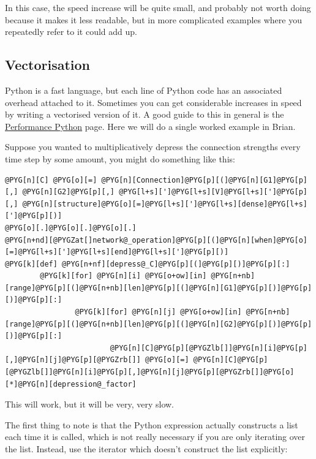 \documentclass[letterpaper,10pt,english]{manual}
\begin{document}
In this case, the speed increase will be quite small, and probably
not worth doing because it makes it less readable, but in more
complicated examples where you repeatedly refer to 
it could add up.
\hypertarget{efficiency-vectorisation}{}

\subsection{Vectorisation}

Python is a fast language, but each line of Python code has an
associated overhead attached to it. Sometimes you can get considerable
increases in speed by writing a vectorised version of it. A good guide
to this in general is the \href{http://www.scipy.org/PerformancePython}{Performance Python}
page. Here we will do a single worked example in Brian.

Suppose you wanted to multiplicatively depress the connection
strengths every time step by some amount, you might do something like
this:

\begin{Verbatim}[commandchars=@\[\]]
@PYG[n][C] @PYG[o][=] @PYG[n][Connection]@PYG[p][(]@PYG[n][G1]@PYG[p][,] @PYG[n][G2]@PYG[p][,] @PYG[l+s][']@PYG[l+s][V]@PYG[l+s][']@PYG[p][,] @PYG[n][structure]@PYG[o][=]@PYG[l+s][']@PYG[l+s][dense]@PYG[l+s][']@PYG[p][)]
@PYG[o][.]@PYG[o][.]@PYG[o][.]
@PYG[n+nd][@PYGZat[]network@_operation]@PYG[p][(]@PYG[n][when]@PYG[o][=]@PYG[l+s][']@PYG[l+s][end]@PYG[l+s][']@PYG[p][)]
@PYG[k][def] @PYG[n+nf][depress@_C]@PYG[p][(]@PYG[p][)]@PYG[p][:]
        @PYG[k][for] @PYG[n][i] @PYG[o+ow][in] @PYG[n+nb][range]@PYG[p][(]@PYG[n+nb][len]@PYG[p][(]@PYG[n][G1]@PYG[p][)]@PYG[p][)]@PYG[p][:]
                @PYG[k][for] @PYG[n][j] @PYG[o+ow][in] @PYG[n+nb][range]@PYG[p][(]@PYG[n+nb][len]@PYG[p][(]@PYG[n][G2]@PYG[p][)]@PYG[p][)]@PYG[p][:]
                        @PYG[n][C]@PYG[p][@PYGZlb[]]@PYG[n][i]@PYG[p][,]@PYG[n][j]@PYG[p][@PYGZrb[]] @PYG[o][=] @PYG[n][C]@PYG[p][@PYGZlb[]]@PYG[n][i]@PYG[p][,]@PYG[n][j]@PYG[p][@PYGZrb[]]@PYG[o][*]@PYG[n][depression@_factor]
\end{Verbatim}

This will work, but it will be very, very slow.

The first thing to note is that the Python expression 
actually constructs a list \code{{[}0,1,2,...,N-1{]}} each time it is called,
which is not really necessary if you are only iterating over the list.
Instead, use the  iterator which doesn't construct the list
explicitly:
\end{document}
